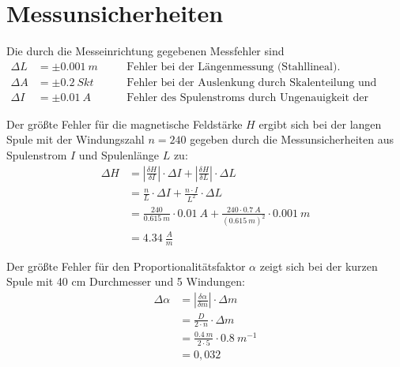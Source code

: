 \section{Messunsicherheiten}
Die durch die Messeinrichtung gegebenen Messfehler sind
\begin{align*}
    \Delta L &= \pm \SI{0,001}{m} &\quad& \text{Fehler bei der Längenmessung (Stahllineal).}\\
    \Delta A &= \pm \SI{0,2}{Skt} &\quad& \text{Fehler bei der Auslenkung durch Skalenteilung und Leuchtpunkt.}\\
    \Delta I &= \pm \SI{0,01}{A}  &\quad& \text{Fehler des Spulenstroms durch Ungenauigkeit der Stromquelle.}
\end{align*}

Der größte Fehler für die magnetische Feldstärke $ H $ ergibt sich bei der langen Spule mit der Windungszahl $ n=240 $ gegeben
durch die Messunsicherheiten aus Spulenstrom $I$ und Spulenlänge $L$ zu:
\begin{align}
    \Delta H    &= \left\vert\frac{\delta H}{\delta I}\right\vert \cdot \Delta I + \left\vert\frac{\delta H}{\delta L}\right\vert \cdot \Delta L \nonumber\\
                &= \frac{n}{L} \cdot \Delta I + \frac{n \cdot I}{L^{2}} \cdot \Delta L \nonumber\\
                &= \frac{240}{\SI{0,615}{m}} \cdot \SI{0,01}{A} + \frac{240 \cdot \SI{0,7}{A}}{(\SI{0,615}{m})^2} \cdot \SI{0,001}{m}\nonumber\\
                &= \SI{4,34}{\frac{A}{m}} \nonumber
\end{align}



Der größte Fehler für den Proportionalitätsfaktor $\alpha$ zeigt sich bei der kurzen Spule mit 40 cm Durchmesser und 5 Windungen:
\begin{align}
    \Delta \alpha   &= \left\vert\frac{\delta \alpha}{\delta m}\right\vert \cdot \Delta m \nonumber\\
                    &= \frac{D}{2 \cdot n} \cdot \Delta m \nonumber\\
                    &= \frac{\SI{0,4}{m}}{2 \cdot 5} \cdot \SI{0,8}{m^{-1}} \nonumber\\
                    &= 0,032 \nonumber
\end{align}